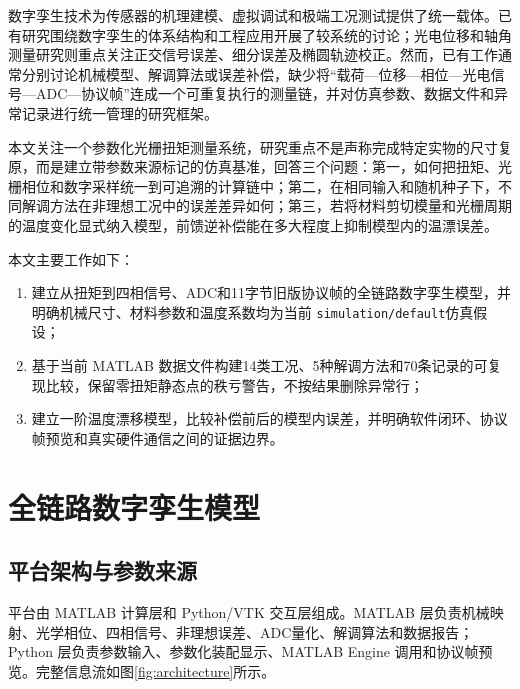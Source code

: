 \documentclass[UTF8,a4paper,12pt]{ctexart}
\newcommand{\simdefault}{\texttt{simulation/default}}
\begin{document}
数字孪生技术为传感器的机理建模、虚拟调试和极端工况测试提供了统一载体。已有研究围绕数字孪生的体系结构和工程应用开展了较系统的讨论\cite{ref1,ref2}；光电位移和轴角测量研究则重点关注正交信号误差、细分误差及椭圆轨迹校正\cite{ref3,ref4,ref5,ref6,ref7,ref9,ref10,ref11}。然而，已有工作通常分别讨论机械模型、解调算法或误差补偿，缺少将“载荷—位移—相位—光电信号—ADC—协议帧”连成一个可重复执行的测量链，并对仿真参数、数据文件和异常记录进行统一管理的研究框架。

本文关注一个参数化光栅扭矩测量系统，研究重点不是声称完成特定实物的尺寸复原，而是建立带参数来源标记的仿真基准，回答三个问题：第一，如何把扭矩、光栅相位和数字采样统一到可追溯的计算链中；第二，在相同输入和随机种子下，不同解调方法在非理想工况中的误差差异如何；第三，若将材料剪切模量和光栅周期的温度变化显式纳入模型，前馈逆补偿能在多大程度上抑制模型内的温漂误差。

本文主要工作如下：
\begin{enumerate}[label=（\arabic*）,leftmargin=3em]
  \item 建立从扭矩到四相信号、ADC和11字节旧版协议帧的全链路数字孪生模型，并明确机械尺寸、材料参数和温度系数均为当前 \simdefault 仿真假设；
  \item 基于当前 MATLAB 数据文件构建14类工况、5种解调方法和70条记录的可复现比较，保留零扭矩静态点的秩亏警告，不按结果删除异常行；
  \item 建立一阶温度漂移模型，比较补偿前后的模型内误差，并明确软件闭环、协议帧预览和真实硬件通信之间的证据边界。
\end{enumerate}

\section{全链路数字孪生模型}

\subsection{平台架构与参数来源}

平台由 MATLAB 计算层和 Python/VTK 交互层组成。MATLAB 层负责机械映射、光学相位、四相信号、非理想误差、ADC量化、解调算法和数据报告；Python 层负责参数输入、参数化装配显示、MATLAB Engine 调用和协议帧预览。完整信息流如图\ref{fig:architecture}所示。
\end{document}
